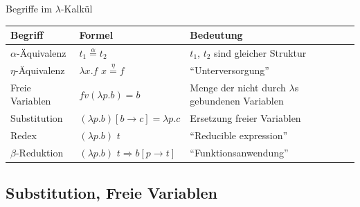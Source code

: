 \documentclass{beamer}
\begin{document}
\newcommand{\aeq}{\stackrel{\alpha}{=}}
\newcommand{\naeq}{\stackrel{\alpha}{\neq}}
\newcommand{\eeq}{\stackrel{\eta}{=}}


\begin{frame}{Begriffe im $\lambda$-Kalkül}
	\fontsize{9pt}{13}\selectfont

	\begin{tabularx}{\textwidth}{ s | X | X }
		\textbf{Begriff} & \textbf{Formel} & \textbf{Bedeutung} \\
		\hline
		$\alpha$-Äquivalenz & $t_1 \aeq t_2$ & $t_1$, $t_2$ sind gleicher Struktur \\
		\hline
		$\eta$-Äquivalenz & $\lambda{}x.f$ $x \eeq f$ & \enquote{Unterversorgung} \\
		\hline
		Freie Variablen & $fv(\lambda{}p.b) = { b }$ & Menge der nicht durch $\lambda$s gebundenen Variablen \\
		\hline
		Substitution & $(\lambda{}p.b)\left[b\rightarrow{}c\right]=\lambda{}p.c$ & Ersetzung freier Variablen \\
		\hline
		Redex & $(\lambda{}p.b)$ $t$ & \enquote{Reducible expression} \\
		\hline
		$\beta$-Reduktion & $(\lambda{}p.b)$ $t \Rightarrow b\left[p\rightarrow{}t\right]$ & \enquote{Funktionsanwendung} \\
	\end{tabularx}
\end{frame}

\subsection{Substitution, Freie Variablen}
\end{document}
